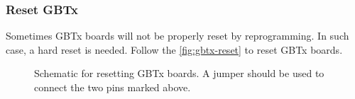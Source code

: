 \subsubsection{Reset GBTx}
Sometimes GBTx boards will not be properly reset by reprogramming. In such case,
a hard reset is needed.
Follow the \autoref{fig:gbtx-reset} to reset GBTx boards.

\begin{figure}[!ht]
\centering
{}
\caption{
    Schematic for resetting GBTx boards. A jumper should be used to connect the
    two pins marked above.
}
\label{fig:gbtx-reset}
\end{figure}
